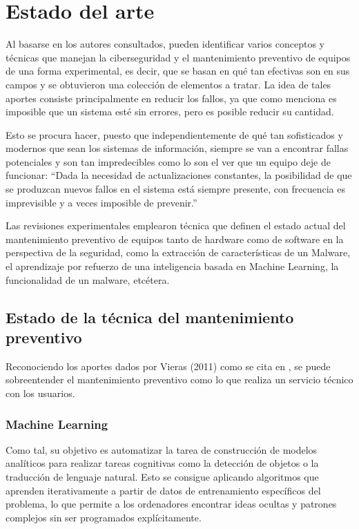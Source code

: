 \pagebreak
\section{Estado del arte}

Al basarse en los autores consultados, pueden identificar varios conceptos y
técnicas que manejan la ciberseguridad y el mantenimiento preventivo de equipos
de una forma experimental, es decir, que se basan en qué tan efectivas son en
sus campos y se obtuvieron una colección de elementos a tratar. La idea de
tales aportes consiste principalmente en reducir los fallos, ya que como
menciona \textcite{Rathore2023} es imposible que un sistema esté sin errores,
pero es posible reducir su cantidad.

Esto se procura hacer, puesto que independientemente de qué tan sofisticados y
modernos que sean los sistemas de información, siempre se van a encontrar fallas
potenciales y son tan impredecibles como lo son el ver que un equipo deje de
funcionar: ``Dada la necesidad de actualizaciones constantes, la posibilidad de
que se produzcan nuevos fallos en el sistema está siempre presente, con
frecuencia es imprevisible y a veces imposible de prevenir.''
\parencite{Banja2020}

Las revisiones experimentales emplearon técnica que definen el estado actual
del mantenimiento preventivo de equipos tanto de hardware como de software en
la perspectiva de la seguridad, como la extracción de características de un
Malware, el aprendizaje por refuerzo de una inteligencia basada en Machine
Learning, la funcionalidad de un malware, etcétera.

\subsection{Estado de la técnica del mantenimiento preventivo}

Reconociendo los aportes dados por Vieras (2011) como
se cita en \cite{Zambrano2020}, se puede sobreentender el mantenimiento
preventivo como lo que realiza un servicio técnico con los usuarios.

\subsubsection{Machine Learning}

Como tal, su objetivo es automatizar la tarea de construcción de modelos
analíticos para realizar tareas cognitivas como la detección de objetos o la
traducción de lenguaje natural. Esto se consigue aplicando algoritmos que
aprenden iterativamente a partir de datos de entrenamiento específicos del
problema, lo que permite a los ordenadores encontrar ideas ocultas y patrones
complejos sin ser programados explícitamente.
\parencite[Bishop, 2006  como se cita en][]{Janiesch2021}

